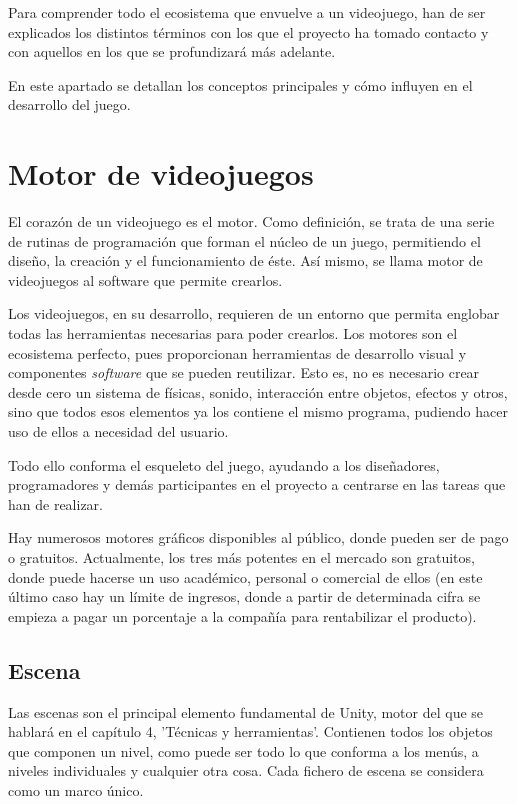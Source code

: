  \label{cap:conceptos}
Para comprender todo el ecosistema que envuelve a un videojuego, han de ser explicados los distintos términos con los que el proyecto ha tomado contacto y con aquellos en los que se profundizará más adelante.

En este apartado se detallan los conceptos principales y cómo influyen en el desarrollo del juego.

\section{Motor de videojuegos}

El corazón de un videojuego es el motor. Como definición, se trata de una serie de rutinas de programación que forman el núcleo de un juego, permitiendo el diseño, la creación y el funcionamiento de éste. Así mismo, se llama motor de videojuegos al software que permite crearlos.

Los videojuegos, en su desarrollo, requieren de un entorno que permita englobar todas las herramientas necesarias para poder crearlos. Los motores son el ecosistema perfecto, pues proporcionan herramientas de desarrollo visual y componentes \textit{software} que se pueden reutilizar. Esto es, no es necesario crear desde cero un sistema de físicas, sonido, interacción entre objetos, efectos y otros, sino que todos esos elementos ya los contiene el mismo programa, pudiendo hacer uso de ellos a necesidad del usuario. 

Todo ello conforma el esqueleto del juego, ayudando a los diseñadores, programadores y demás participantes en el proyecto a centrarse en las tareas que han de realizar.

Hay numerosos motores gráficos disponibles al público, donde pueden ser de pago o gratuitos. Actualmente, los tres más potentes en el mercado son gratuitos, donde puede hacerse un uso académico, personal o comercial de ellos (en este último caso hay un límite de ingresos, donde a partir de determinada cifra se empieza a pagar un porcentaje a la compañía para rentabilizar el producto).

\subsection{Escena}

Las escenas son el principal elemento fundamental de Unity, motor del que se hablará en el capítulo 4, 'Técnicas y herramientas'. Contienen todos los objetos que componen un nivel, como puede ser todo lo que conforma a los menús, a niveles individuales y cualquier otra cosa. Cada fichero de escena se considera como un marco único.

